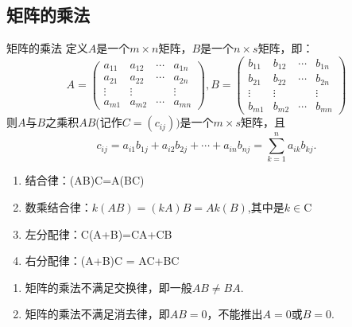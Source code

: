 \documentclass[lang=cn,10pt]{elegantbook}
\begin{document}
\subsection{矩阵的乘法}
\begin{definition}{矩阵的乘法}
    定义$A$是一个$m \times n$矩阵，$B$是一个$n \times s$矩阵，即：
    \begin{equation}
        A = \begin{pmatrix}
       a_{11}&a_{12}& \cdots & a_{1n}\\
       a_{21}&a_{22}& \cdots & a_{2n}\\
       \vdots&\vdots&         &\vdots\\
       a_{m1}&a_{m2}& \cdots & a_{mn}
        \end{pmatrix}
        ,
        B = \begin{pmatrix}
       b_{11}&b_{12}& \cdots & b_{1n}\\
       b_{21}&b_{22}& \cdots & b_{2n}\\
       \vdots&\vdots&         &\vdots\\
       b_{m1}&b_{m2}& \cdots & b_{mn}
        \end{pmatrix}
    \end{equation}
    则$A$与$B$之乘积$AB$(记作$C=(c_{ij}))$是一个$m \times s$矩阵，且
    \begin{equation}
        c_{ij}=a_{i1}b_{1j}+a_{i2}b_{2j}+\cdots+a_{in}b_{nj}=\sum\limits_{k=1}^n a_{ik} b_{kj}.
    \end{equation}
    
\end{definition}

\begin{property}
\begin{enumerate}
     \item 结合律：(AB)C=A(BC)
    \item 数乘结合律：$k(AB)=(kA)B=Ak(B)$,其中是$k \in \mathrm{C}$
    \item 左分配律：C(A+B)=CA+CB
    \item 右分配律：(A+B)C = AC+BC
\end{enumerate}
\end{property}

\begin{conclusion}
    \begin{enumerate}
        \item 矩阵的乘法不满足交换律，即一般$AB \ne BA$.
        \item 矩阵的乘法不满足消去律，即$AB=0$，不能推出$A=0$或$B=0$.
    \end{enumerate}
\end{conclusion}
\end{document}
